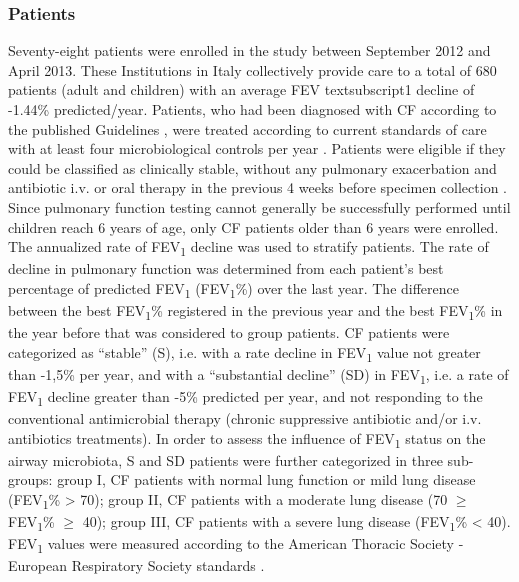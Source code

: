 \subsubsection{Patients}
Seventy-eight patients were enrolled in the study between September 2012 and April 2013. These Institutions in Italy collectively provide care to a total of 680 patients (adult and children) with an average FEV textsubscript{1} decline of -1.44\% predicted/year. Patients, who had been diagnosed with CF according to the published Guidelines \cite{farrell2008guidelines}, were treated according to current standards of care with at least four microbiological controls per year \cite{flume2009cystic}. Patients were eligible if they could be classified as clinically stable, without any pulmonary exacerbation and antibiotic i.v. or oral therapy in the previous 4 weeks before specimen collection \cite{ramsey1999intermittent, fuchs1994effect}. Since pulmonary function testing cannot generally be successfully performed until children reach 6 years of age, only CF patients older than 6 years were enrolled. The annualized rate of FEV\textsubscript{1} decline was used to stratify patients. The rate of decline in pulmonary function was determined from each patient's best percentage of predicted FEV\textsubscript{1} (FEV\textsubscript{1}\%) over the last year. The difference between the best FEV\textsubscript{1}\% registered in the previous year and the best FEV\textsubscript{1}\% in the year before that was considered to group patients. CF patients were categorized as ``stable'' (S), i.e. with a rate decline in FEV\textsubscript{1} value not greater than -1,5\% per year, and with a ``substantial decline'' (SD) in FEV\textsubscript{1}, i.e. a rate of FEV\textsubscript{1} decline greater than -5\% predicted per year, and not responding to the conventional antimicrobial therapy (chronic suppressive antibiotic and/or i.v. antibiotics treatments). In order to assess the influence of FEV\textsubscript{1} status on the airway microbiota, S and SD patients were further categorized in three sub-groups: group I, CF patients with normal lung function or mild lung disease (FEV\textsubscript{1}\% {\textgreater} 70); group II, CF patients with a moderate lung disease (70 $\geq$ FEV\textsubscript{1}\% $\geq$ 40); group III, CF patients with a severe lung disease (FEV\textsubscript{1}\% {\textless} 40). FEV\textsubscript{1} values were measured according to the American Thoracic Society - European Respiratory Society standards \cite{miller2005standardisation}.\\

